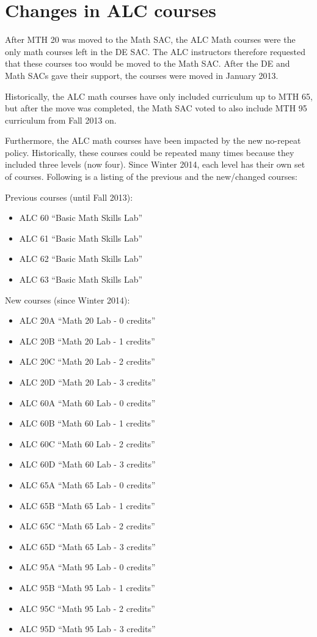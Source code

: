 \chapter{Changes in ALC courses}\label{app:sec:alc}
After MTH 20 was moved to the Math SAC, the ALC Math courses were the only math courses left in the DE SAC. The ALC instructors therefore requested that these courses too would be moved to the Math SAC. After the DE and Math SACs gave their support, the courses were moved in January 2013.

Historically, the ALC math courses have only included curriculum up to MTH 65, but after the move was completed, the Math SAC voted to also include MTH 95 curriculum from Fall 2013 on.

Furthermore, the ALC math courses have been impacted by the new no-repeat policy. Historically, these courses could be repeated many times because they included three levels (now four). Since Winter 2014, each level has their own set of courses. Following is a listing  of the previous and the new/changed courses:

Previous courses (until Fall 2013):
\begin{itemize}[label={}]
  \item ALC 60 ``Basic Math Skills Lab''
  \item ALC 61 ``Basic Math Skills Lab''
  \item ALC 62 ``Basic Math Skills Lab''
  \item ALC 63 ``Basic Math Skills Lab''
\end{itemize}
New courses (since Winter 2014):
\begin{itemize}[label={}]
  \item ALC 20A ``Math 20 Lab - 0 credits'' 
  \item ALC 20B ``Math 20 Lab - 1 credits'' 
  \item ALC 20C ``Math 20 Lab - 2 credits'' 
  \item ALC 20D ``Math 20 Lab - 3 credits'' 

  \item ALC 60A ``Math 60 Lab - 0 credits'' 
  \item ALC 60B ``Math 60 Lab - 1 credits'' 
  \item ALC 60C ``Math 60 Lab - 2 credits'' 
  \item ALC 60D ``Math 60 Lab - 3 credits'' 

  \item ALC 65A ``Math 65 Lab - 0 credits'' 
  \item ALC 65B ``Math 65 Lab - 1 credits'' 
  \item ALC 65C ``Math 65 Lab - 2 credits'' 
  \item ALC 65D ``Math 65 Lab - 3 credits'' 

  \item ALC 95A ``Math 95 Lab - 0 credits'' 
  \item ALC 95B ``Math 95 Lab - 1 credits'' 
  \item ALC 95C ``Math 95 Lab - 2 credits'' 
  \item ALC 95D ``Math 95 Lab - 3 credits''
\end{itemize}

